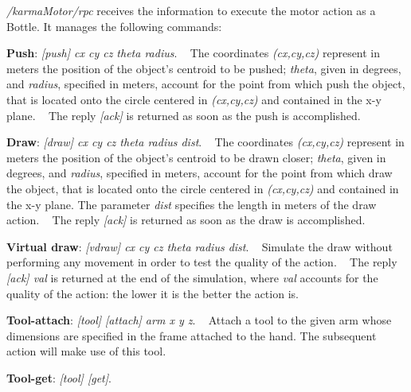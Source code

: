 \begin{DoxyItemize}
\item {\itshape /karma\+Motor/rpc} receives the information to execute the motor action as a Bottle. It manages the following commands\+:
\begin{DoxyEnumerate}
\item {\bfseries Push}\+: {\itshape \mbox{[}push\mbox{]} cx cy cz theta radius}. ~\newline
 The coordinates {\itshape (cx,cy,cz)} represent in meters the position of the object's centroid to be pushed; {\itshape theta}, given in degrees, and {\itshape radius}, specified in meters, account for the point from which push the object, that is located onto the circle centered in {\itshape (cx,cy,cz)} and contained in the x-\/y plane. ~\newline
 The reply {\itshape \mbox{[}ack\mbox{]}} is returned as soon as the push is accomplished.
\item {\bfseries Draw}\+: {\itshape \mbox{[}draw\mbox{]} cx cy cz theta radius dist}. ~\newline
 The coordinates {\itshape (cx,cy,cz)} represent in meters the position of the object's centroid to be drawn closer; {\itshape theta}, given in degrees, and {\itshape radius}, specified in meters, account for the point from which draw the object, that is located onto the circle centered in {\itshape (cx,cy,cz)} and contained in the x-\/y plane. The parameter {\itshape dist} specifies the length in meters of the draw action. ~\newline
 The reply {\itshape \mbox{[}ack\mbox{]}} is returned as soon as the draw is accomplished.
\item {\bfseries Virtual draw}\+: {\itshape \mbox{[}vdraw\mbox{]} cx cy cz theta radius dist}. ~\newline
 Simulate the draw without performing any movement in order to test the quality of the action. ~\newline
 The reply {\itshape \mbox{[}ack\mbox{]} val} is returned at the end of the simulation, where {\itshape val} accounts for the quality of the action\+: the lower it is the better the action is.
\item {\bfseries Tool-\/attach}\+: {\itshape \mbox{[}tool\mbox{]} \mbox{[}attach\mbox{]} arm x y z}. ~\newline
 Attach a tool to the given arm whose dimensions are specified in the frame attached to the hand. The subsequent action will make use of this tool.
\item {\bfseries Tool-\/get}\+: {\itshape \mbox{[}tool\mbox{]} \mbox{[}get\mbox{]}}. ~\newline

\end{DoxyEnumerate}
\end{DoxyItemize}
